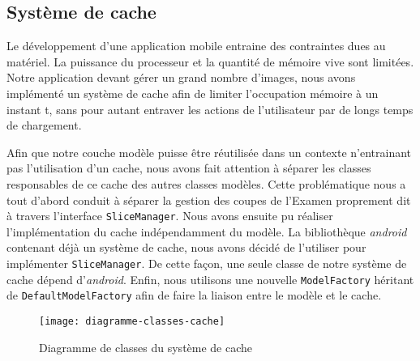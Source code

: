 \subsection{Système de cache}

Le développement d'une application mobile entraine des contraintes dues au matériel. La puissance du processeur et la quantité de mémoire vive sont limitées. Notre application devant gérer un grand nombre d'images, nous avons implémenté un système de cache afin de limiter l'occupation mémoire à un instant t, sans pour autant entraver les actions de l'utilisateur par de longs temps de chargement.

Afin que notre couche modèle puisse être réutilisée dans un contexte n'entrainant pas l'utilisation d'un cache, nous avons fait attention à séparer les classes responsables de ce cache des autres classes modèles. Cette problématique nous a tout d'abord conduit à séparer la gestion des coupes de l'Examen proprement dit à travers l'interface \verb+SliceManager+. Nous avons ensuite pu réaliser l'implémentation du cache indépendamment du modèle. La bibliothèque \emph{android} contenant déjà un système de cache, nous avons décidé de l'utiliser pour implémenter \verb+SliceManager+. De cette façon, une seule classe de notre système de cache dépend d'\emph{android}. Enfin, nous utilisons une nouvelle \verb+ModelFactory+ héritant de \verb+DefaultModelFactory+ afin de faire la liaison entre le modèle et le cache.

\begin{figure}[h]
\begin{center}
	\texttt{[image: diagramme-classes-cache]}
\end{center}
	\caption{Diagramme de classes du système de cache}
	\label{classes-cache}
\end{figure}